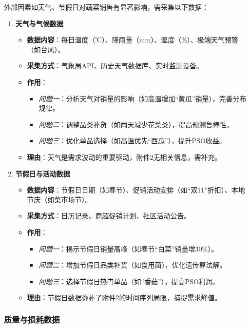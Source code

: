 \documentclass{cumcmthesis} %
\begin{document}
外部因素如天气、节假日对蔬菜销售有显著影响，需采集以下数据：

\begin{enumerate}
\item \textbf{天气与气候数据}
\begin{itemize}
\item \textbf{数据内容}：每日温度（℃）、降雨量（mm）、湿度（\%）、极端天气预警（如台风）。
\item \textbf{采集方式}：气象局API、历史天气数据库、实时监测设备。
\item \textbf{作用}：
\begin{itemize}
\item \textit{问题一}：分析天气对销量的影响（如高温增加“黄瓜”销量），完善分布规律。
\item \textit{问题二}：调整品类补货（如雨天减少花菜类），提高预测鲁棒性。
\item \textit{问题三}：优化单品选择（如高温优先“西瓜”），提升PSO收益。
\end{itemize}
\item \textbf{理由}：天气是需求波动的重要驱动，附件2无相关信息，需补充。
\end{itemize}

\item \textbf{节假日与活动数据}
\begin{itemize}
\item \textbf{数据内容}：节假日日期（如春节）、促销活动安排（如“双11”折扣）、本地节庆（如菜市场节）。
\item \textbf{采集方式}：日历记录、商超促销计划、社区活动公告。
\item \textbf{作用}：
\begin{itemize}
\item \textit{问题一}：揭示节假日销量高峰（如春节“白菜”销量增30\%）。
\item \textit{问题二}：增加节假日品类补货（如食用菌），优化遗传算法解。
\item \textit{问题三}：选择节假日热门单品（如“香菇”），提高PSO利润。
\end{itemize}
\item \textbf{理由}：节假日数据弥补了附件2的时间序列局限，捕捉需求峰值。
\end{itemize}
\end{enumerate}

\subsubsection{质量与损耗数据}
\end{document}
